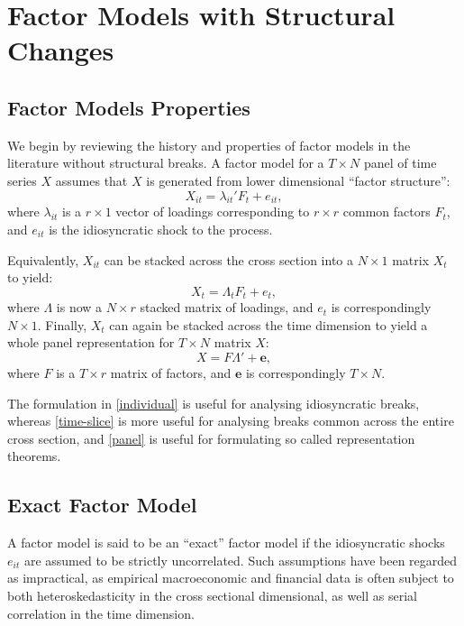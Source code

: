 \documentclass[
]{article}
\begin{document}
\section{Factor Models with Structural Changes}

\hypertarget{empirical-motivation}{%
\subsection{Factor Models Properties}\label{empirical-motivation}}

We begin by reviewing the history and properties of factor models in the literature without structural breaks. A factor model for a \(T \times N\) panel of time series \(X\) assumes that \(X\) is generated from lower dimensional ``factor structure'':
\begin{equation}\label{individual}
X_{it} = \lambda_{it}' F_t + e_{it},
\end{equation}
where $\lambda_{it}$ is a $r \times 1$ vector of loadings corresponding to $r \times r$ common factors $F_t$, and $e_{it}$ is the idiosyncratic shock to the process.

Equivalently, $X_{it}$ can be stacked across the cross section into a $N \times 1$ matrix $X_t$ to yield:
\begin{equation}\label{time-slice}
X_t = \Lambda_t F_t + e_t,
\end{equation}
where $\Lambda$ is now a $N \times r$ stacked matrix of loadings, and $e_t$ is correspondingly $N \times 1$.
Finally, $X_{t}$ can again be stacked across the time dimension to yield a whole panel representation for $T \times N$ matrix $X$:
\begin{equation}\label{panel}
X = F \Lambda' + \mathbf{e},
\end{equation}
where $F$ is a $T \times r$ matrix of factors, and $\mathbf{e}$ is correspondingly $T \times N$.

The formulation in \ref{individual} is useful for analysing idiosyncratic breaks, whereas \ref{time-slice} is more useful for analysing breaks common across the entire cross section, and \ref{panel} is useful for formulating so called representation theorems.

\subsection{Exact Factor Model}

A factor model is said to be an ``exact'' factor model if the idiosyncratic shocks $e_{it}$ are assumed to be strictly uncorrelated. Such assumptions have been regarded as impractical, as empirical macroeconomic and financial data is often subject to both heteroskedasticity in the cross sectional dimensional, as well as serial correlation in the time dimension.
\end{document}
